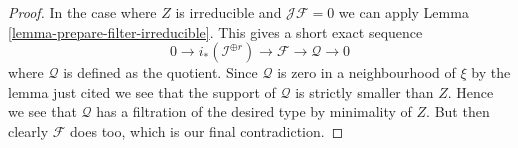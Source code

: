 \begin{proof}
\medskip\noindent
In the case where $Z$ is irreducible and $\mathcal{J}\mathcal{F} = 0$
we can apply Lemma \ref{lemma-prepare-filter-irreducible}.
This gives a short exact sequence
$$
0 \to
i_*(\mathcal{I}^{\oplus r}) \to
\mathcal{F} \to
\mathcal{Q} \to 0
$$
where $\mathcal{Q}$ is defined as the quotient.
Since $\mathcal{Q}$ is zero in a neighbourhood of $\xi$ by
the lemma just cited we see that the support of $\mathcal{Q}$
is strictly smaller than $Z$. Hence we see that $\mathcal{Q}$
has a filtration of the desired type by minimality of $Z$.
But then clearly $\mathcal{F}$ does too, which is our final contradiction.
\end{proof}